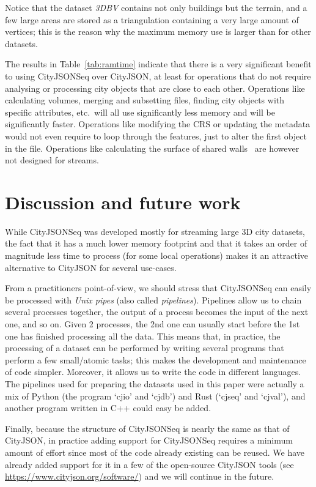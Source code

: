 \documentclass{isprs} %
\begin{document}
Notice that the dataset \emph{3DBV} contains not only buildings but the terrain, and a few large areas are stored as a triangulation containing a very large amount of vertices; this is the reason why the maximum memory use is larger than for other datasets. 

%

The results in Table~\ref{tab:ramtime} indicate that there is a very significant benefit to using CityJSONSeq over CityJSON, at least for operations that do not require analysing or processing city objects that are close to each other.
Operations like calculating volumes, merging and subsetting files, finding city objects with specific attributes, etc.\ will all use significantly less memory and will be significantly faster.
Operations like modifying the CRS or updating the metadata would not even require to loop through the features, just to alter the first object in the file.
Operations like calculating the surface of shared walls~\citep{Agugiaro22} are however not designed for streams.


%
\section{Discussion and future work}%
\label{sec:discussion}



While CityJSONSeq was developed mostly for streaming large 3D city datasets, the fact that it has a much lower memory footprint and that it takes an order of magnitude less time to process (for some local operations) makes it an attractive alternative to CityJSON for several use-cases.

%

From a practitioners point-of-view, we should stress that CityJSONSeq can easily be processed with \emph{Unix pipes} (also called \emph{pipelines}).
Pipelines allow us to chain several processes together, the output of a process becomes the input of the next one, and so on. 
Given 2 processes, the 2nd one can usually start before the 1st one has finished processing all the data.
This means that, in practice, the processing of a dataset can be performed by writing several programs that perform a few small/atomic tasks; this makes the development and maintenance of code simpler.
Moreover, it allows us to write the code in different languages. 
The pipelines used for preparing the datasets used in this paper were actually a mix of Python (the program `cjio' and `cjdb') and Rust (`cjseq' and `cjval'), and another program written in C++ could easy be added.

%

Finally, because the structure of CityJSONSeq is nearly the same as that of CityJSON, in practice adding support for CityJSONSeq requires a minimum amount of effort since most of the code already existing can be reused. 
We have already added support for it in a few of the open-source CityJSON tools (see \url{https://www.cityjson.org/software/}) and we will continue in the future.


\newpage
{
	\begin{spacing}{1.17}
		\normalsize
	\end{spacing}
}
\end{document}
